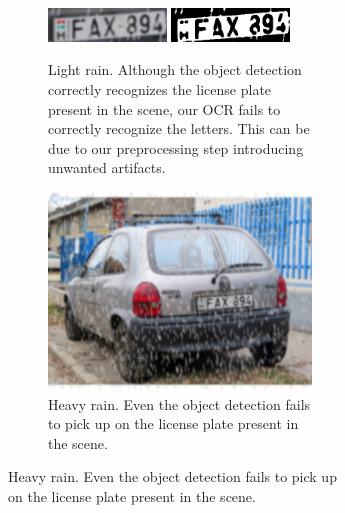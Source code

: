 \begin{figure}
\begin{subfigure}[t]{\textwidth}
\begin{subfigure}[t]{.4\textwidth}
            \includegraphics[width=0.45\textwidth]{figures/weather-results/cutouts/lightrain_0.jpg}
            \includegraphics[width=0.45\textwidth]{figures/weather-results/cleared/lightrain_0.jpg}
            \caption{Light rain. Although the object detection correctly
                recognizes the license plate present in the scene, our OCR fails
                to correctly recognize the letters. This can be due to our
                preprocessing step introducing unwanted artifacts.}
        \end{subfigure}
        \begin{subfigure}[t]{.4\textwidth}
            \centering
            \includegraphics[width=\textwidth]{figures/rain.jpg}
            \caption{Heavy rain. Even the object detection fails to pick up on
            the license plate present in the scene.}
        \end{subfigure}
        \label{fig:weather-rains}
    \end{subfigure}
    \begin{subfigure}[b]{\textwidth}
        \centering
        \begin{subfigure}[b]{.4\textwidth}
            \centering

\end{subfigure}
\end{subfigure}
\end{figure}
